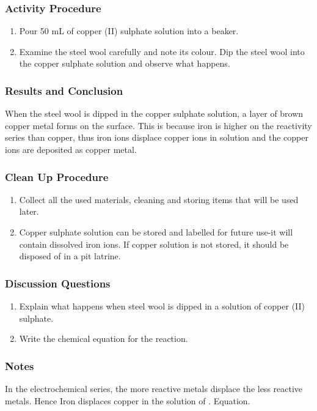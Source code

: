 \subsubsection*{Activity Procedure}
\begin{enumerate}
\item {Pour 50 mL of copper (II) sulphate solution into a beaker.}
\item{Examine the steel wool carefully and note its colour. Dip the steel wool into the copper sulphate solution and observe what happens.}
\end{enumerate}

\subsubsection*{Results and Conclusion}
When the steel wool is dipped in the copper sulphate solution, a layer of brown copper metal forms on the surface. This is because iron is higher on the reactivity series than copper, thus iron ions displace copper ions in solution and the copper ions are deposited as copper metal.

\subsubsection*{Clean Up Procedure}
\begin{enumerate}
\item{Collect all the used materials, cleaning and storing items that will be used later.}
\item{Copper sulphate solution can be stored and labelled for future use-it will contain dissolved iron ions. If copper solution is not stored, it should be disposed of in a pit latrine.}
\end{enumerate}

\subsubsection*{Discussion Questions}
\begin{enumerate}
\item{Explain what happens when steel wool is dipped in a solution of copper (II) sulphate.}
\item{Write the chemical equation for the reaction.}
\end{enumerate}

\subsubsection*{Notes}
In the electrochemical series, the more reactive metals displace the less reactive metals. Hence Iron displaces copper in the solution of .
Equation.

